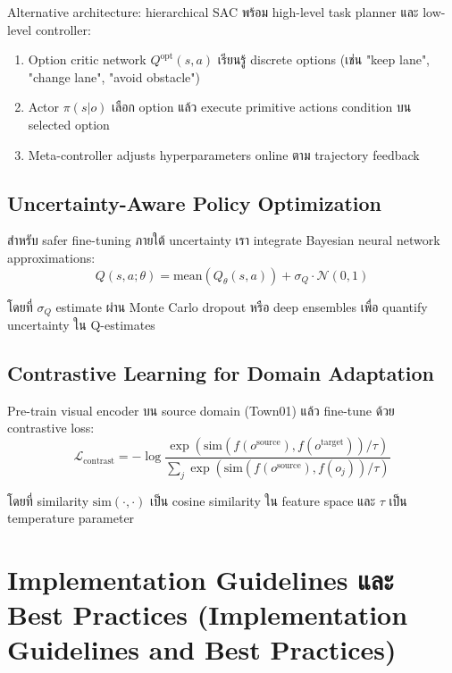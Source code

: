 \documentclass[10pt,a4paper,twocolumn]{article}
\begin{document}
Alternative architecture: hierarchical SAC พร้อม high-level task planner และ low-level controller:
\begin{enumerate}
    \item Option critic network $Q^{\text{opt}}(s,a)$ เรียนรู้ discrete options (เช่น "keep lane", "change lane", "avoid obstacle")
    
    \item Actor $\pi(s|o)$ เลือก option แล้ว execute primitive actions condition บน selected option
    
    \item Meta-controller adjusts hyperparameters online ตาม trajectory feedback
\end{enumerate}

\subsection{Uncertainty-Aware Policy Optimization}

สำหรับ safer fine-tuning ภายใต้ uncertainty เรา integrate Bayesian neural network approximations:
\begin{equation}\label{eq:bayesian-uncertainty}
    Q(s,a;\theta) = \text{mean}(Q_\theta(s,a)) + \sigma_Q \cdot \mathcal{N}(0,1)
\end{equation}

โดยที่ $\sigma_Q$ estimate ผ่าน Monte Carlo dropout หรือ deep ensembles เพื่อ quantify uncertainty ใน Q-estimates

\subsection{Contrastive Learning for Domain Adaptation}

Pre-train visual encoder บน source domain (Town01) แล้ว fine-tune ด้วย contrastive loss:
\begin{equation}\label{eq:contrastive-loss}
    \mathcal{L}_{\text{contrast}} = -\log \frac{\exp(\text{sim}(f(o^{\text{source}}), f(o^{\text{target}}))/\tau)}{\sum_j \exp(\text{sim}(f(o^{\text{source}}), f(o_j))/\tau)}
\end{equation}

โดยที่ similarity $\text{sim}(\cdot,\cdot)$ เป็น cosine similarity ใน feature space และ $\tau$ เป็น temperature parameter

\section{Implementation Guidelines และ Best Practices (Implementation Guidelines and Best Practices)}
\end{document}
